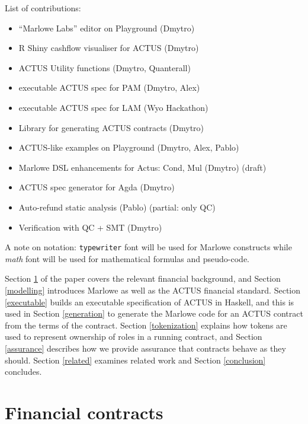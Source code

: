 \documentclass[runningheads]{llncs}
\begin{document}
\bigskip\noindent
List of contributions:
\begin{itemize}
\item \textquotedblleft Marlowe Labs\textquotedblright{} editor on Playground
(Dmytro) 
\item R Shiny cashflow visualiser for ACTUS (Dmytro) 
\item ACTUS Utility functions (Dmytro, Quanterall) 
\item executable ACTUS spec for PAM (Dmytro, Alex) 
\item executable ACTUS spec for LAM (Wyo Hackathon) 
\item Library for generating ACTUS contracts (Dmytro) 
\item ACTUS-like examples on Playground (Dmytro, Alex, Pablo) 
\item Marlowe DSL enhancements for Actus: Cond, Mul (Dmytro) (draft) 
\item ACTUS spec generator for Agda (Dmytro) 
\item Auto-refund static analysis (Pablo) (partial: only QC) 
\item Verification with QC + SMT (Dmytro) 
\end{itemize}

A note on notation: \texttt{typewriter} font will be used for Marlowe constructs
while \emph{math} font will be used for mathematical formulas and pseudo-code.

Section \ref{background} of the paper covers the relevant financial background, and Section \ref{modelling} introduces Marlowe as well as the ACTUS financial standard. Section \ref{executable} builds an executable specification of ACTUS in Haskell, and this is used in Section \ref{generation} to generate  the Marlowe code for an ACTUS contract from the terms of the contract. Section \ref{tokenization} explains how tokens are used to represent ownership of roles in a running contract, and Section \ref{assurance} describes how we provide assurance that  contracts behave as they should. Section \ref{related} examines related work and Section \ref{conclusion} concludes. 



\section{Financial contracts}
\label{background}
\end{document}
